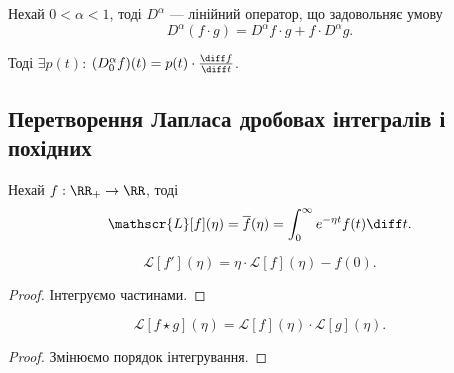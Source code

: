 \begin{theorem}[Тарасова]
    Нехай $0 < \alpha < 1$, тоді $D^\alpha$ --- лінійний оператор, що задовольняє умову
    \begin{equation}
        D^\alpha(f \cdot g) = D^\alpha f \cdot g + f \cdot D^\alpha g.
    \end{equation}
    
    Тоді $\exists p(t)$: $(D_0^\alpha f) (t) = p(t) \cdot \frac{\diff f}{\diff t}$.
\end{theorem}

\subsection{Перетворення Лапласа дробовах інтегралів і похідних}

\begin{definition}
    Нехай $f: \RR_+ \to \RR$, тоді 
    \begin{equation}
        \mathscr{L}[f](\eta) = \overline{f}(\eta) = \int_0^\infty e^{-\eta t} f(t) \diff t.
    \end{equation}
\end{definition}

\begin{lemma}
    \begin{equation}
        \mathscr{L}[f'](\eta) = \eta \cdot \mathscr{L}[f](\eta) - f(0).
    \end{equation}
\end{lemma}
\begin{proof}
    Інтегруємо частинами.
\end{proof}

\begin{lemma}
    \begin{equation}
        \mathscr{L}[f \star g](\eta) = \mathscr{L}[f](\eta) \cdot \mathscr{L}[g](\eta).
    \end{equation}
\end{lemma}
\begin{proof}
    Змінюємо порядок інтегрування.
\end{proof}

